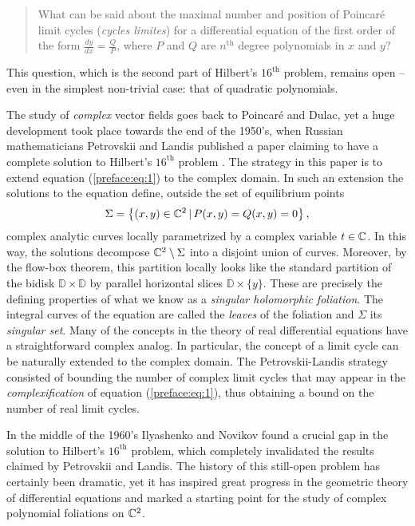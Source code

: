 \documentclass[phd,tocprelim]{cornell}
\begin{document}
\bigskip
\begin{quote}
\singlespacing
 What can be said about the maximal number and position of Poincar\'{e} limit cycles (\textit{cycles limites}) for a differential equation of the first order of the form $\frac{dy}{dx}=\frac{Q}{P}$, where $P$ and $Q$ are $n^{\text{th}}$ degree polynomials in $x$ and $y$?
\end{quote}

\noindent This question, which is the second part of Hilbert's $16^{\text{th}}$ problem, remains open -- even in the simplest non-trivial case: that of quadratic polynomials.

The study of \textit{complex} vector fields goes back to Poincar\'{e} and Dulac, yet a huge development took place towards the end of the 1950's, when Russian mathematicians Petrovskii and Landis published a paper claiming to have a complete solution to Hilbert's $16^{\text{th}}$ problem \cite{PetrovskiiLandis1957}. The strategy in this paper is to extend equation (\ref{preface:eq:1}) to the complex domain. In such an extension the solutions to the equation define, outside the set of equilibrium points
 \[ \Sigma = \left\{{(x,y)\in\mathbb{C}^2}\,\vert\,{P(x,y)=Q(x,y)=0}\right\}, \]
complex analytic curves locally parametrized by a complex variable $t\in\mathbb{C}$. In this way, the solutions decompose $\mathbb{C}^2\setminus\Sigma$ into a disjoint union of curves. Moreover, by the flow-box theorem, this partition locally looks like the standard partition of the bidisk $\mathbb{D}\times\mathbb{D}$ by parallel horizontal slices $\mathbb{D}\times\{y\}$. These are precisely the defining properties of what we know as a \textit{singular holomorphic foliation}. The integral curves of the equation are called the \textit{leaves} of the foliation and $\Sigma$ its \textit{singular set}. Many of the concepts in the theory of real differential equations have a straightforward complex analog. In particular, the concept of a limit cycle can be naturally extended to the complex domain. The Petrovskii-Landis strategy consisted of bounding the number of complex limit cycles that may appear in the \textit{complexification} of equation (\ref{preface:eq:1}), thus obtaining a bound on the number of real limit cycles. 

In the middle of the 1960's Ilyashenko and Novikov found a crucial gap in the solution to Hilbert's $16^{\text{th}}$ problem, which completely invalidated the results claimed by Petrovskii and Landis. The history of this still-open problem has certainly been dramatic, yet it has inspired great progress in the geometric theory of differential equations and marked a starting point for the study of complex polynomial foliations on $\mathbb{C}^2$.
\end{document}
